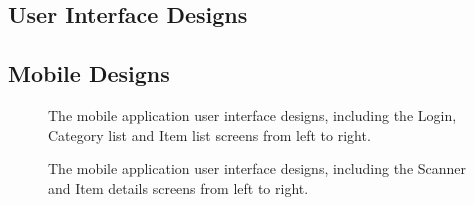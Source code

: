 \documentclass[a4paper,11pt]{report}
\begin{document}
\newpage
{}
\begin{appendix}
    \chapter{User Interface Designs}
    \section{Mobile Designs}
    \begin{figure}[H]
        \centering
        \caption{The mobile application user interface designs, including the Login, Category list and Item list screens from left to right.}
        \label{fig:mobileUIpt1}
    \end{figure}
    \begin{figure}[H]
        \centering
        \caption{The mobile application user interface designs, including the Scanner and Item details screens from left to right.}
        \label{fig:mobileUIpt2}
    \end{figure}

\end{appendix}
\end{document}
